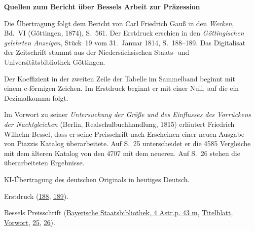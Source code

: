 \clearpage\thispagestyle{empty}
\begin{center}\Large\bfseries Quellen zum Bericht über Bessels Arbeit zur Präzession\end{center}

Die Übertragung folgt dem Bericht von Carl Friedrich Gauß in den \emph{Werken}, Bd.~VI (Göttingen, 1874), S.~561. Der Erstdruck erschien in den \emph{Göttingischen gelehrten Anzeigen}, Stück~19 vom 31.~Januar 1814, S.~188--189. Das Digitalisat der Zeitschrift stammt aus der Niedersächsischen Staats- und Universitätsbibliothek Göttingen.

Der Koeffizient in der zweiten Zeile der Tabelle im Sammelband beginnt mit einem c-förmigen Zeichen. Im Erstdruck beginnt er mit einer Null, auf die ein Dezimalkomma folgt.

Im Vorwort zu seiner \emph{Untersuchung der Größe und des Einflusses des Vorrückens der Nachtgleichen} (Berlin, Realschulbuchhandlung, 1815) erläutert Friedrich Wilhelm Bessel, dass er seine Preisschrift nach Erscheinen einer neuen Ausgabe von Piazzis Katalog überarbeitete. Auf S.~25 unterscheidet er die 4585 Vergleiche mit dem älteren Katalog von den 4707 mit dem neueren. Auf S.~26 stehen die überarbeiteten Ergebnisse.

KI-Übertragung des deutschen Originals in heutiges Deutsch.

Erstdruck (\href{https://images.p.sub.uni-goettingen.de/iiif/image/gdz:PPN319721507_1814:00000190/full/1650,/0/default.jpg}{188}, \href{https://images.p.sub.uni-goettingen.de/iiif/image/gdz:PPN319721507_1814:00000191/full/1650,/0/default.jpg}{189}).

Bessels Preisschrift (\href{https://www.digitale-sammlungen.de/de/view/bsb10049066?page=3}{Bayerische Staatsbibliothek, 4 Astr.p. 43 m}, \href{https://api.digitale-sammlungen.de/iiif/image/v2/bsb10049066_00003/full/1700,/0/default.jpg}{Titelblatt}, \href{https://api.digitale-sammlungen.de/iiif/image/v2/bsb10049066_00005/full/1700,/0/default.jpg}{Vorwort}, \href{https://api.digitale-sammlungen.de/iiif/image/v2/bsb10049066_00027/full/1700,/0/default.jpg}{25}, \href{https://api.digitale-sammlungen.de/iiif/image/v2/bsb10049066_00028/full/1700,/0/default.jpg}{26}).

\clearpage
